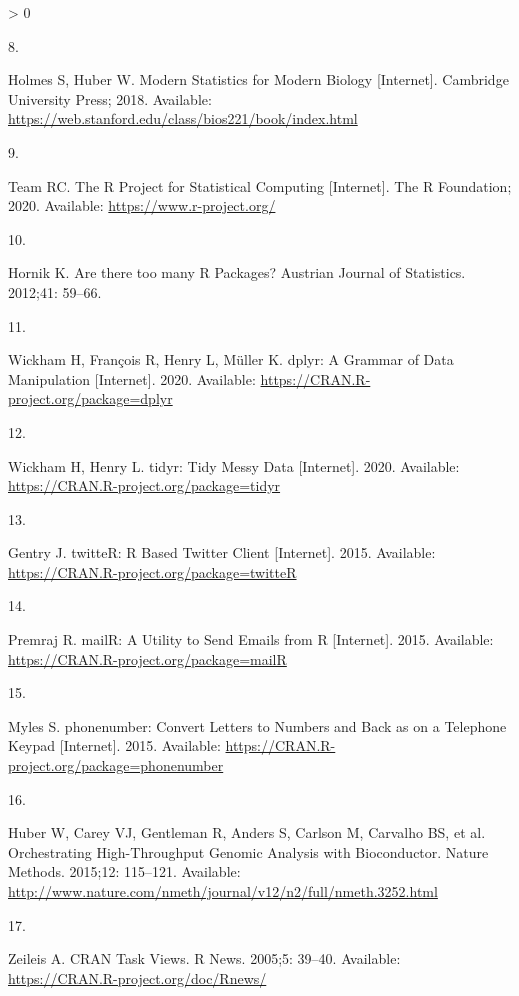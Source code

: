 \documentclass[10pt,letterpaper]{article}
\newlength{\csllabelwidth}
\newlength{\cslhangindent}
\newenvironment{CSLReferences}[3] %
 {%
  \setlength{\parindent}{0pt}
  \ifodd #1 \everypar{\setlength{\hangindent}{\cslhangindent}}\ignorespaces\fi
  \ifnum #2 > 0
  \setlength{\parskip}{#2\baselineskip}
  \fi
 }%
 {}
\newcommand{\CSLLeftMargin}[1]{\parbox[t]{\csllabelwidth}{#1}}
\newcommand{\CSLRightInline}[1]{\parbox[t]{\linewidth - \csllabelwidth}{#1}}
\begin{document}
\begin{CSLReferences}{0}{0}
\leavevmode\hypertarget{ref-holmes2018}{}%
\CSLLeftMargin{8. }
\CSLRightInline{Holmes S, Huber W. {Modern Statistics for Modern
Biology} {[}Internet{]}. Cambridge University Press; 2018. Available:
\url{https://web.stanford.edu/class/bios221/book/index.html}}

\leavevmode\hypertarget{ref-Rproject2020}{}%
\CSLLeftMargin{9. }
\CSLRightInline{Team RC. {The R Project for Statistical Computing}
{[}Internet{]}. The R Foundation; 2020. Available:
\url{https://www.r-project.org/}}

\leavevmode\hypertarget{ref-hornik2012}{}%
\CSLLeftMargin{10. }
\CSLRightInline{Hornik K. {Are there too many R Packages?} Austrian
Journal of Statistics. 2012;41: 59--66. }

\leavevmode\hypertarget{ref-dplyr}{}%
\CSLLeftMargin{11. }
\CSLRightInline{Wickham H, François R, Henry L, Müller K. {dplyr: A
Grammar of Data Manipulation} {[}Internet{]}. 2020. Available:
\url{https://CRAN.R-project.org/package=dplyr}}

\leavevmode\hypertarget{ref-tidyr}{}%
\CSLLeftMargin{12. }
\CSLRightInline{Wickham H, Henry L. {tidyr: Tidy Messy Data}
{[}Internet{]}. 2020. Available:
\url{https://CRAN.R-project.org/package=tidyr}}

\leavevmode\hypertarget{ref-twitteR}{}%
\CSLLeftMargin{13. }
\CSLRightInline{Gentry J. {twitteR: R Based Twitter Client}
{[}Internet{]}. 2015. Available:
\url{https://CRAN.R-project.org/package=twitteR}}

\leavevmode\hypertarget{ref-mailR}{}%
\CSLLeftMargin{14. }
\CSLRightInline{Premraj R. {mailR: A Utility to Send Emails from R}
{[}Internet{]}. 2015. Available:
\url{https://CRAN.R-project.org/package=mailR}}

\leavevmode\hypertarget{ref-phonenumber}{}%
\CSLLeftMargin{15. }
\CSLRightInline{Myles S. {phonenumber: Convert Letters to Numbers and
Back as on a Telephone Keypad} {[}Internet{]}. 2015. Available:
\url{https://CRAN.R-project.org/package=phonenumber}}

\leavevmode\hypertarget{ref-bioCproject}{}%
\CSLLeftMargin{16. }
\CSLRightInline{Huber W, Carey VJ, Gentleman R, Anders S, Carlson M,
Carvalho BS, et al. {Orchestrating High-Throughput Genomic Analysis with
Bioconductor}. Nature Methods. 2015;12: 115--121. Available:
\url{http://www.nature.com/nmeth/journal/v12/n2/full/nmeth.3252.html}}

\leavevmode\hypertarget{ref-ctv}{}%
\CSLLeftMargin{17. }
\CSLRightInline{Zeileis A. {CRAN Task Views}. R News. 2005;5: 39--40.
Available: \url{https://CRAN.R-project.org/doc/Rnews/}}


\end{CSLReferences}
\end{document}
